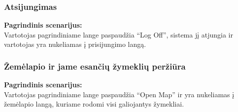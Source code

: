 \documentclass{VUMIFPSkursinis}
\begin{document}
\subsubsection{Atsijungimas}
	\textbf{Pagrindinis scenarijus:}\\
	Vartotojas pagrindiniame lange paspaudžia “Log Off”, sistema jį atjungia ir vartotojas yra nukeliamas į prisijungimo langą.

\subsubsection{Žemėlapio ir jame esančių žymeklių peržiūra}
	\textbf{Pagrindinis scenarijus:}\\
	Vartotojas pagrindiniame lange paspaudžia “Open Map” ir yra nukeliamas į žemėlapio langą, kuriame rodomi visi galiojantys žymekliai.
\end{document}
